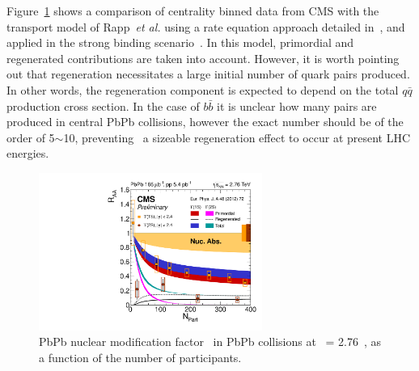 Figure~\ref{fig:RAA_TH_cent_rapp} shows a comparison of centrality binned data from CMS with the transport model of
Rapp~\textit{et al.} using a rate equation approach detailed
in~\cite{Emerick:2011xu}, and applied in the strong binding
scenario~\cite{Zhao:2011cv}. In this model, primordial and regenerated contributions are taken into
account. However, it is worth pointing out that regeneration
necessitates a large initial number of quark pairs produced. In other
words, the regeneration component is expected to depend on the total
$q\bar{q}$ production cross section. In the case
of $b\bar{b}$ it is unclear how many pairs are produced in central PbPb collisions, however the exact number should be
of the order of 5$\sim$10, preventing \PgU\ a sizeable regeneration
effect to occur at present LHC energies.
\begin{figure}[h]
  \begin{centering}  
    \includegraphics[width=0.65\textwidth]{Chapters/aUpsilon/RAA_NPART_Rapp.pdf}
    \caption{PbPb nuclear modification factor \RAA\ in PbPb collisions
      at \snn\ = 2.76~\TeV, as a function of the number of participants.}
    \label{fig:RAA_TH_cent_rapp}
  \end{centering}  
\end{figure}

